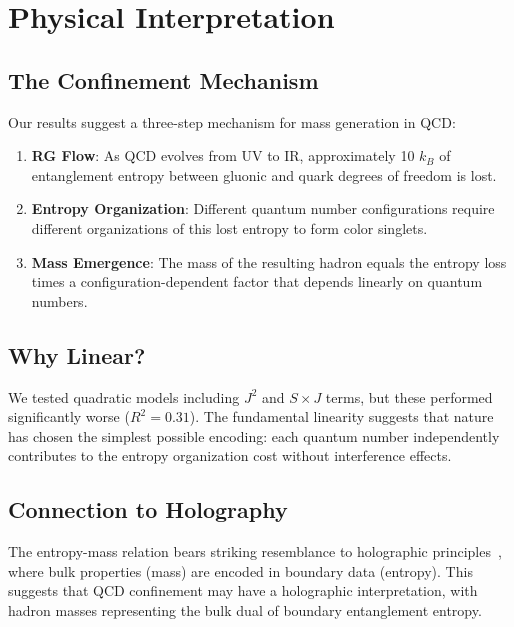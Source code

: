 \documentclass[12pt,a4paper]{article}
\begin{document}
\section{Physical Interpretation}

\subsection{The Confinement Mechanism}

Our results suggest a three-step mechanism for mass generation in QCD:

\begin{enumerate}
\item \textbf{RG Flow}: As QCD evolves from UV to IR, approximately 10 $k_B$ of entanglement entropy between gluonic and quark degrees of freedom is lost.

\item \textbf{Entropy Organization}: Different quantum number configurations require different organizations of this lost entropy to form color singlets.

\item \textbf{Mass Emergence}: The mass of the resulting hadron equals the entropy loss times a configuration-dependent factor that depends linearly on quantum numbers.
\end{enumerate}

\subsection{Why Linear?}

We tested quadratic models including $J^2$ and $S \times J$ terms, but these performed significantly worse ($R^2 = 0.31$). The fundamental linearity suggests that nature has chosen the simplest possible encoding: each quantum number independently contributes to the entropy organization cost without interference effects.

\subsection{Connection to Holography}

The entropy-mass relation bears striking resemblance to holographic principles~\cite{Ryu2006,Brodsky2006}, where bulk properties (mass) are encoded in boundary data (entropy). This suggests that QCD confinement may have a holographic interpretation, with hadron masses representing the bulk dual of boundary entanglement entropy.
\end{document}
